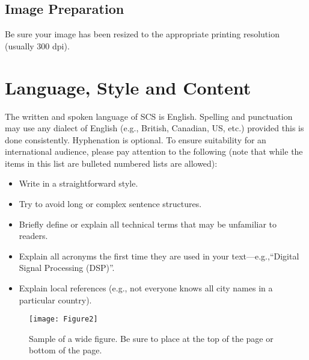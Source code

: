 \documentclass{scsPaperFormattingTemplate-LaTex-Revised20160302}
\begin{document}
\subsection{Image Preparation}

Be sure your image has been resized to the appropriate printing resolution (usually 300 dpi).

\section{Language, Style and Content}

The written and spoken language of SCS is English. Spelling and punctuation may use any dialect of English (e.g., British, Canadian, US, etc.) provided this is done consistently. Hyphenation is optional. To ensure suitability for an international audience, please pay attention to the following (note that while the items in this list are bulleted numbered lists are allowed):

\begin{itemize}
\item Write in a straightforward style.
\item Try to avoid long or complex sentence structures.
\item Briefly define or explain all technical terms that may be unfamiliar to readers.
\item Explain all acronyms the first time they are used in your text---e.g.,``Digital Signal Processing (DSP)''.
\item Explain local references (e.g., not everyone knows all city names in a particular country).
\end{itemize}

\begin{figure*}[t]
	\centering
	\texttt{[image: Figure2]}
	\centering
	\caption{Sample of a wide figure. Be sure to place at the top of the page or bottom of the page.}
	\centering
	\label{fig:figure2}
\end{figure*}
\end{document}
